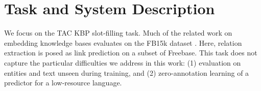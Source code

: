 






\section{Task and System Description}

We focus on the TAC KBP slot-filling task. Much of the related work on embedding knowledge bases evaluates on the FB15k dataset \citep{transe,wang2014knowledge,lin2015learning,bishan,toutanova2015representing}. Here, relation extraction is posed as link prediction on a subset of Freebase.  This task does not capture the particular difficulties we address in this work: (1) evaluation on entities and text unseen during training, and (2) zero-annotation learning of a predictor for a low-resource language.

